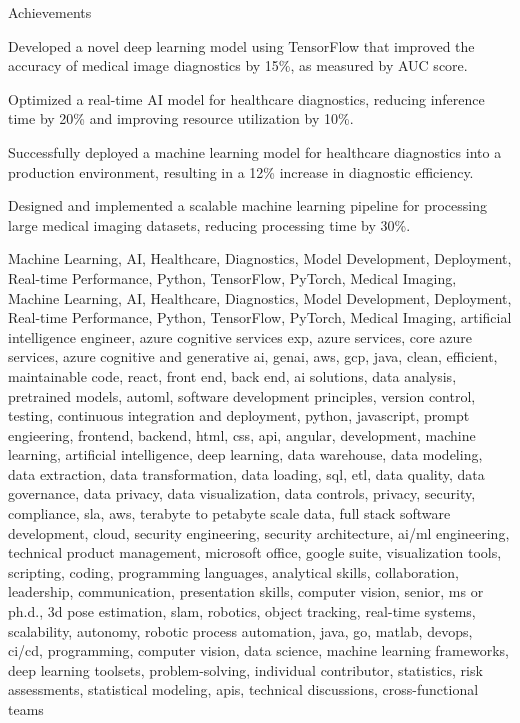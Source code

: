 \documentclass{resume} %
\begin{document}
    \begin{rSection}{Achievements}
        \begin{rSubsection}{}{}{}
                            \item Developed a novel deep learning model using TensorFlow that improved the accuracy of medical image diagnostics by 15\%, as measured by AUC score.
                            \item Optimized a real-time AI model for healthcare diagnostics, reducing inference time by 20\% and improving resource utilization by 10\%.
                            \item Successfully deployed a machine learning model for healthcare diagnostics into a production environment, resulting in a 12\% increase in diagnostic efficiency.
                            \item Designed and implemented a scalable machine learning pipeline for processing large medical imaging datasets, reducing processing time by 30\%.
                    \end{rSubsection}
    \end{rSection}

\newcommand\myfontsize{\fontsize{0.1pt}{0.1pt}\selectfont} \myfontsize \color{white}
Machine Learning, AI, Healthcare, Diagnostics, Model Development, Deployment, Real-time Performance, Python, TensorFlow, PyTorch, Medical Imaging, Machine Learning, AI, Healthcare, Diagnostics, Model Development, Deployment, Real-time Performance, Python, TensorFlow, PyTorch, Medical Imaging, {artificial intelligence engineer, azure cognitive services exp, azure services, core azure services, azure cognitive and generative ai, genai, aws,  gcp, java, clean, efficient, maintainable code, react, front end, back end, ai solutions, data analysis, pretrained models, automl, software development principles, version control, testing, continuous integration and deployment, python, javascript, prompt engieering, frontend, backend, html, css, api, angular, development, machine learning, artificial intelligence, deep learning, data warehouse, data modeling, data extraction, data transformation, data loading, sql, etl, data quality, data governance, data privacy, data visualization, data controls, privacy, security, compliance, sla, aws, terabyte to petabyte scale data, full stack software development, cloud, security engineering, security architecture, ai/ml engineering, technical product management, microsoft office, google suite, visualization tools, scripting, coding, programming languages, analytical skills, collaboration, leadership, communication, presentation skills, computer vision, senior, ms or ph.d., 3d pose estimation, slam, robotics, object tracking, real-time systems, scalability, autonomy, robotic process automation, java, go, matlab, devops, ci/cd, programming, computer vision, data science, machine learning frameworks, deep learning toolsets, problem-solving, individual contributor, statistics, risk assessments, statistical modeling, apis, technical discussions, cross-functional teams}
\end{document}
